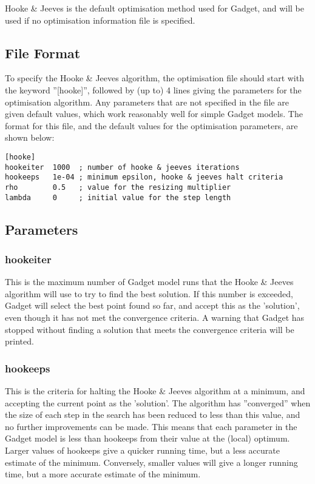 \documentclass[10pt,twoside]{book}
\begin{document}
\bigskip
Hooke \& Jeeves is the default optimisation method used for Gadget, and will be used if no optimisation information file is specified.

\subsection{File Format}\label{subsec:hookefile}
To specify the Hooke \& Jeeves algorithm, the optimisation file should start with the keyword ''[hooke]'', followed by (up to) 4 lines giving the parameters for the optimisation algorithm.  Any parameters that are not specified in the file are given default values, which work reasonably well for simple Gadget models.  The format for this file, and the default values for the optimisation parameters, are shown below:

{\small\begin{verbatim}
[hooke]
hookeiter  1000  ; number of hooke & jeeves iterations
hookeeps   1e-04 ; minimum epsilon, hooke & jeeves halt criteria
rho        0.5   ; value for the resizing multiplier
lambda     0     ; initial value for the step length
\end{verbatim}}

\subsection{Parameters}\label{subsec:hookepar}
\subsubsection{hookeiter}
This is the maximum number of Gadget model runs that the Hooke \& Jeeves algorithm will use to try to find the best solution.  If this number is exceeded, Gadget will select the best point found so far, and accept this as the 'solution', even though it has not met the convergence criteria.  A warning that Gadget has stopped without finding a solution that meets the convergence criteria will be printed.

\subsubsection{hookeeps}
This is the criteria for halting the Hooke \& Jeeves algorithm at a minimum, and accepting the current point as the 'solution'.  The algorithm has ''converged'' when the size of each step in the search has been reduced to less than this value, and no further improvements can be made.  This means that each parameter in the Gadget model is less than hookeeps from their value at the (local) optimum.  Larger values of hookeeps give a quicker running time, but a less accurate estimate of the minimum.  Conversely, smaller values will give a longer running time, but a more accurate estimate of the minimum.
\end{document}
